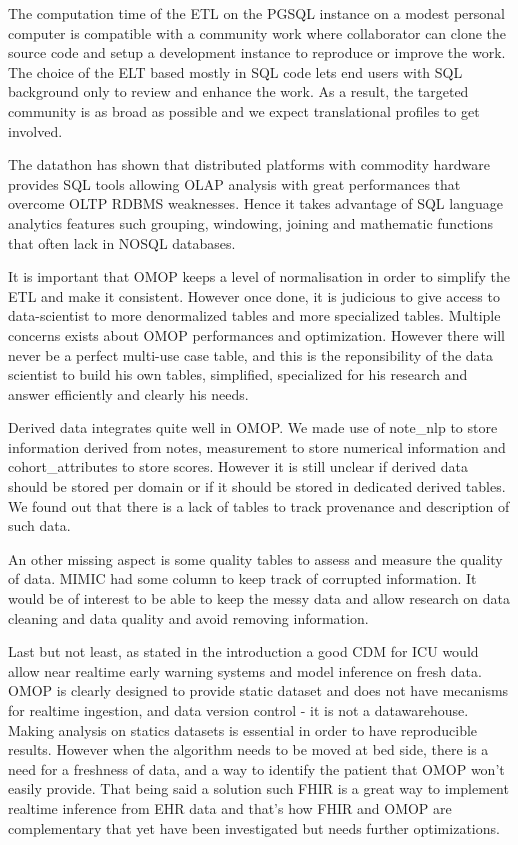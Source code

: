 
The computation time of the ETL on the PGSQL instance on a modest personal
computer is compatible with a community work where collaborator can clone the
source code and setup a development instance to reproduce or improve the work.
The choice of the ELT based mostly in SQL code lets end users with SQL
background only to review and enhance the work. As a result, the targeted
community is as broad as possible and we expect translational profiles to get
involved.

The datathon has shown that distributed platforms with commodity hardware
provides SQL tools allowing OLAP analysis with great performances that overcome
OLTP RDBMS weaknesses. Hence it takes advantage of SQL language analytics
features such grouping, windowing, joining and mathematic functions that often
lack in NOSQL databases.

It is important that OMOP keeps a level of normalisation in order to simplify
the ETL and make it consistent. However once done, it is judicious to give
access to data-scientist to more denormalized tables and more specialized
tables. Multiple concerns exists about OMOP performances and optimization.
However there will never be a perfect multi-use case table, and this is the
reponsibility of the data scientist to build his own tables, simplified,
specialized for his research and answer efficiently and clearly his needs.

Derived data integrates quite well in OMOP. We made use of note\_nlp to store
information derived from notes, measurement to store numerical information and
cohort\_attributes to store scores. However it is still unclear if derived data
should be stored per domain or if it should be stored in dedicated derived
tables. We found out that there is a lack of tables to track provenance and
description of such data.

An other missing aspect is some quality tables to assess and measure the
quality of data. MIMIC had some column to keep track of corrupted information.
It would be of interest to be able to keep the messy data and allow research on
data cleaning and data quality and avoid removing information.

Last but not least, as stated in the introduction a good CDM for ICU would
allow near realtime early warning systems and model inference on fresh data.
OMOP is clearly designed to provide static dataset and does not have mecanisms
for realtime ingestion, and data version control - it is not a datawarehouse.
Making analysis on statics datasets is essential in order to have reproducible
results. However when the algorithm needs to be moved at bed side, there is a
need for a freshness of data, and a way to identify the patient that OMOP won't
easily provide. That being said a solution such FHIR is a great way to
implement realtime inference from EHR data and that's how FHIR and OMOP are
complementary that yet have been investigated \cite{gatech} but needs further
optimizations.

